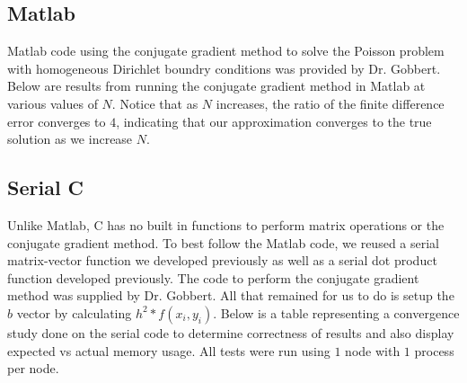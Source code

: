 \documentclass[11pt]{article}
\begin{document}
\subsection{Matlab}
Matlab code using the conjugate gradient method to solve the Poisson problem with homogeneous Dirichlet boundry conditions was provided by Dr. Gobbert. Below are results from running the conjugate gradient method in Matlab at various values of $N$. Notice that as $N$ increases, the ratio of the finite difference error converges to $4$, indicating that our approximation converges to the true solution as we increase $N$.
\begin{table}[!htbp]
\end{table}

\subsection{Serial C}
Unlike Matlab, C has no built in functions to perform matrix operations or the conjugate gradient method. To best follow the Matlab code, we reused a serial matrix-vector function we developed previously as well as a serial dot product function developed previously. The code to perform the conjugate gradient method was supplied by Dr. Gobbert. All that remained for us to do is setup the $b$ vector by calculating $h^2 * f(x_i, y_i)$. Below is a table representing a convergence study done on the serial code to determine correctness of results and also display expected vs actual memory usage. All tests were run using $1$ node with $1$ process per node.
\end{document}
